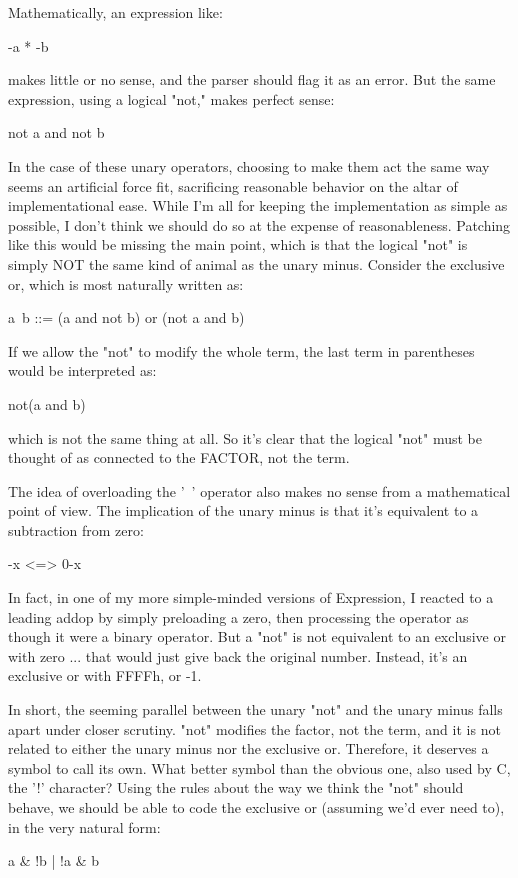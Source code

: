 \documentclass[float=false, crop=false]{standalone}
\begin{document}
Mathematically, an expression like:

	-a * -b

makes little or no sense, and the parser should flag it as an error. But the
same expression, using a logical "not," makes perfect sense:

	not a and not b

In the case of these unary operators, choosing to make them act the same way
seems an artificial force fit, sacrificing reasonable behavior on the altar of
implementational ease. While I'm all for keeping the implementation as simple as
possible, I don't think we should do so at the expense of reasonableness.
Patching like this would be missing the main point, which is that the logical
"not" is simply NOT the same kind of animal as the unary minus. Consider the
exclusive or, which is most naturally written as:

	a~b ::= (a and not b) or (not a and b)

If we allow the "not" to modify the whole term, the last term in parentheses
would be interpreted as:

	not(a and b)

which is not the same thing at all. So it's clear that the logical "not" must be
thought of as connected to the FACTOR, not the term.

The idea of overloading the '~' operator also makes no sense from a mathematical
point of view. The implication of the unary minus is that it's equivalent to a
subtraction from zero:

	-x <=> 0-x

In fact, in one of my more simple-minded versions of Expression, I reacted to a
leading addop by simply preloading a zero, then processing the operator as
though it were a binary operator. But a "not" is not equivalent to an exclusive
or with zero ... that would just give back the original number. Instead, it's an
exclusive or with FFFFh, or -1.

In short, the seeming parallel between the unary "not" and the unary minus falls
apart under closer scrutiny. "not" modifies the factor, not the term, and it is
not related to either the unary minus nor the exclusive or. Therefore, it
deserves a symbol to call its own. What better symbol than the obvious one, also
used by C, the '!' character? Using the rules about the way we think the "not"
should behave, we should be able to code the exclusive or (assuming we'd ever
need to), in the very natural form:

	a \& !b | !a \& b
\end{document}
